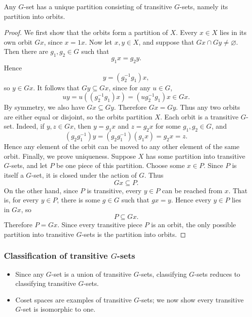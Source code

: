 \documentclass[../Odyssey_Project.tex]{subfiles}
\begin{document}
\begin{proposition}
\label{prop:3.3}
Any $G$-set has a unique partition consisting of transitive $G$-sets, namely its partition into orbits.
\end{proposition}

\begin{proof}
    We first show that the orbits form a partition of $X$. Every $x \in X$ lies in its own orbit $Gx$, since $x = 1x$. Now let $x,y \in X$, and suppose that $Gx \cap Gy \neq \varnothing$. Then there are $g_1,g_2 \in G$ such that
    \[
        g_1x = g_2y.
    \]
    Hence
    \[
        y = (g_2^{-1}g_1)x,
    \]
    so $y \in Gx$. It follows that $Gy \subseteq Gx$, since for any $u \in G$,
    \[
        uy = u((g_2^{-1}g_1)x) = (ug_2^{-1}g_1)x \in Gx.
    \]
    By symmetry, we also have $Gx \subseteq Gy$. Therefore $Gx = Gy$. Thus any two orbits are either equal or disjoint, so the orbits partition $X$.
    Each orbit is a transitive $G$-set. Indeed, if $y,z \in Gx$, then $y = g_1x$ and $z = g_2x$ for some $g_1,g_2 \in G$, and
    \[
        (g_2g_1^{-1})y = (g_2g_1^{-1})(g_1x) = g_2x = z.
    \]
    Hence any element of the orbit can be moved to any other element of the same orbit.
    Finally, we prove uniqueness. Suppose $X$ has some partition into transitive $G$-sets, and let $P$ be one piece of this partition. Choose some $x \in P$. Since $P$ is itself a $G$-set, it is closed under the action of $G$. Thus
    \[
        Gx \subseteq P.
    \]
    On the other hand, since $P$ is transitive, every $y \in P$ can be reached from $x$. That is, for every $y \in P$, there is some $g \in G$ such that $gx = y$. Hence every $y \in P$ lies in $Gx$, so
    \[
        P \subseteq Gx.
    \]
    Therefore $P = Gx$. Since every transitive piece $P$ is an orbit, the only possible partition into transitive $G$-sets is the partition into orbits.
\end{proof}

\subsubsection*{Classification of transitive $G$-sets}
\begin{itemize}
    \item Since any $G$-set is a union of transitive $G$-sets, classifying $G$-sets reduces to classifying transitive $G$-sets.
    \item Coset spaces are examples of transitive $G$-sets; we now show every transitive $G$-set is isomorphic to one.
\end{itemize}
\end{document}
